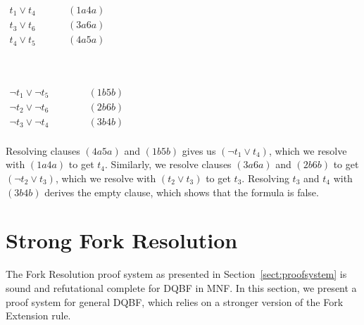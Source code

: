 \documentclass{svjour3}
\begin{document}
\vspace{2mm}
\qquad\quad
\begin{minipage}{.33\textwidth}
\setcounter{equation}{0} 
$
\begin{array}{ll}
 t_1 \vee t_4\qquad~~ & (1a4a) \\ 
 t_3 \vee t_6 & (3a6a) \\
 t_4 \vee t_5 & (4a5a) \\
\end{array}
$
\end{minipage}
\qquad\qquad~
\begin{minipage}{.4\textwidth}
$
\begin{array}{ll}
 \neg t_1 \vee \neg t_5\qquad\quad~ & (1b5b) \\ 
 \neg t_2 \vee \neg t_6 & (2b6b) \\
 \neg t_3 \vee \neg t_4 & (3b4b) \\
\end{array}
$
\end{minipage}

\vspace{2mm}
Resolving clauses $(4a5a)$ and $(1b5b)$ gives us $(\neg t_1 \vee t_4)$, which we resolve with $(1a4a)$ to get $t_4$. 
Similarly, we resolve clauses $(3a6a)$ and $(2b6b)$ to get $(\neg t_2 \vee t_3)$, which we resolve with $(t_2 \vee t_3)$ to get $t_3$. 
Resolving $t_3$ and $t_4$ with $(3b4b)$ derives the empty clause, which shows that the formula is false. 



\section{Strong Fork Resolution}
\label{sect:strong-fork-res}

The Fork Resolution proof system as presented in Section~\ref{sect:proofsystem} is sound and refutational complete for DQBF in MNF.
In this section, we present a proof system for general DQBF, which relies on a stronger version of the Fork Extension rule.
\end{document}
